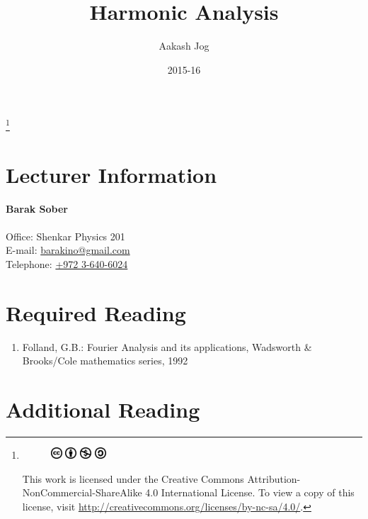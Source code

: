 \documentclass[fleqn, a4paper, 12pt, twoside]{article}
\title{Harmonic Analysis}
\author{Aakash Jog}
\date{2015-16}
\theoremstyle{definition}
\theoremstyle{theorem}
\newcommand\blfootnote[1]{%
	\begingroup
	\renewcommand\thefootnote{}\footnote{#1}%
	\addtocounter{footnote}{-1}%
	\endgroup
}
\begin{document}
\maketitle

\blfootnote
{	
	\begin{figure}[H]
		\includegraphics[height = 12pt]{cc.eps}
		\includegraphics[height = 12pt]{by.eps}
		\includegraphics[height = 12pt]{nc.eps}
		\includegraphics[height = 12pt]{sa.eps}
	\end{figure}
	This work is licensed under the Creative Commons Attribution-NonCommercial-ShareAlike 4.0 International License. To view a copy of this license, visit \url{http://creativecommons.org/licenses/by-nc-sa/4.0/}.
} %

\tableofcontents

\newpage
\section{Lecturer Information}

\textbf{Barak Sober}\\
~\\
Office: Shenkar Physics 201\\
E-mail: \href{mailto:barakino@gmail.com}{barakino@gmail.com}\\
Telephone: \href{tel:+972 3-640-6024}{+972 3-640-6024}

\section{Required Reading}

\begin{enumerate}
	\item Folland, G.B.: Fourier Analysis and its applications, Wadsworth \& Brooks/Cole mathematics series, 1992
\end{enumerate}

\section{Additional Reading}
\end{document}
